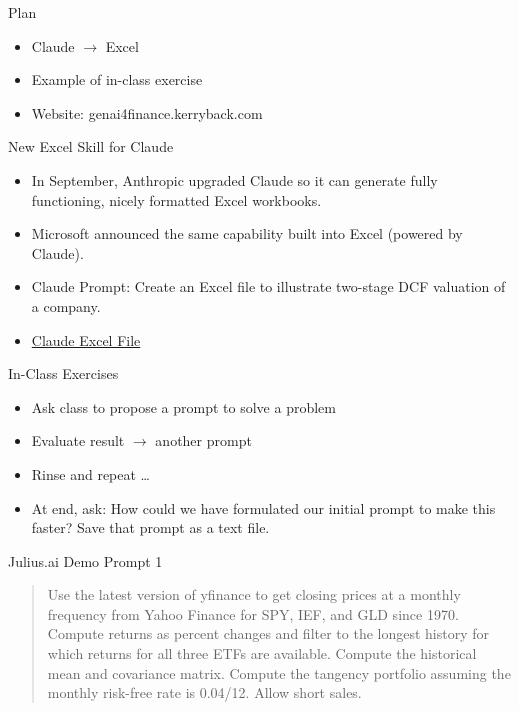 \documentclass{beamer}
\begin{document}
\begin{frame}{Plan}
    \begin{itemize}
     \item Claude $\rightarrow$ Excel
     \item Example of in-class exercise 
     \item Website: genai4finance.kerryback.com
    \end{itemize}
\end{frame}

\begin{frame}{New Excel Skill for Claude}
\begin{itemize}
\item 
In September, Anthropic upgraded Claude so it can generate fully functioning, nicely formatted Excel workbooks.
\item Microsoft announced the same capability built into Excel (powered by Claude).
\item Claude Prompt: Create an Excel file to illustrate two-stage DCF valuation of a company.
\item \href{https://iita2025.kerryback.com/claude-dcf-example.xlsx}{Claude Excel File}
\end{itemize}
\end{frame}

\begin{frame}{In-Class Exercises}
    \begin{itemize}
    \item Ask class to propose a prompt to solve a problem 
    \pause
    \item Evaluate result $\rightarrow$ another prompt
    \item Rinse and repeat \ldots
    \pause
    \item At end, ask: \alert{How could we have formulated our initial prompt to make this faster?}  Save that prompt as a text file.
    \end{itemize}
\end{frame}

\begin{frame}{Julius.ai Demo Prompt 1}
   \begin{quote}
   Use the latest version of yfinance to get closing prices at a monthly frequency from Yahoo Finance for SPY, IEF, and GLD since 1970. Compute returns as percent changes and filter to the longest history for which returns for all three ETFs are available. Compute the historical mean and covariance matrix. Compute the tangency portfolio assuming the monthly risk-free rate is 0.04/12.  Allow short sales.

   \end{quote}
\end{frame}
\end{document}
